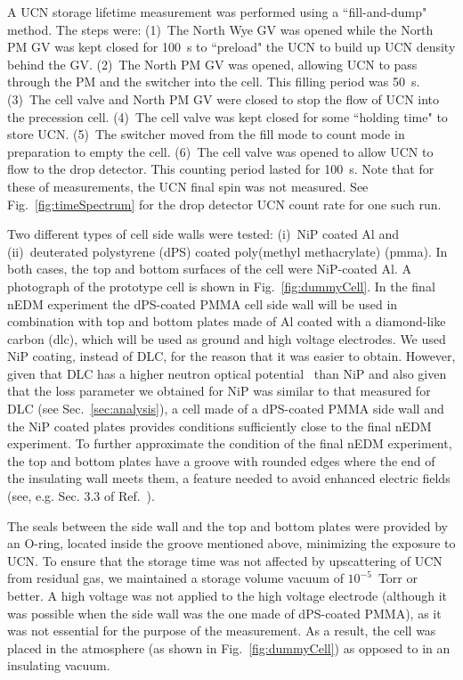 
A UCN storage lifetime measurement was performed using a ``fill-and-dump" method. The steps were: (1)~The North Wye GV was opened while the North PM GV was kept closed for \qty{100}{\s} to ``preload" the UCN to build up UCN density behind the GV. (2)~The North PM GV was opened, allowing UCN to pass through the PM and the switcher into the cell. This filling period was \qty{50}{\s}. (3)~The cell valve and North PM GV were closed to stop the flow of UCN into the precession cell. (4)~The cell valve was kept closed for some ``holding time" to store UCN. (5)~The switcher moved from the fill mode to count mode in preparation to empty the cell. (6)~The cell valve was opened to allow UCN to flow to the drop detector. This counting period lasted for \qty{100}{\s}. Note that for these of measurements, the UCN final spin was not measured. See Fig.~\ref{fig:timeSpectrum} for the drop detector UCN count rate for one such run.

Two different types of cell side walls were tested: (i)~NiP coated Al and (ii)~deuterated polystyrene (dPS) coated poly(methyl methacrylate) (\acrshort*{pmma}). In both cases, the top and bottom surfaces of the cell were NiP-coated Al.  A photograph of the prototype cell is shown in Fig.~\ref{fig:dummyCell}. In the final nEDM experiment the dPS-coated PMMA cell side wall will be used in combination with top and bottom plates made of Al coated with a diamond-like carbon (\acrshort*{dlc}), which will be used as ground and high voltage electrodes. We used NiP coating, instead of DLC, for the reason that it was easier to obtain. However, given that DLC has a higher neutron optical potential~\cite{Atchison2006} than NiP and also given that the loss parameter we obtained for NiP was similar to that measured for DLC (see Sec.~\ref{sec:analysis}), a cell made of a dPS-coated PMMA side wall and the NiP coated plates provides conditions sufficiently close to the final nEDM experiment. To further approximate the condition of the final nEDM experiment, the top and bottom plates have a groove with rounded edges where the end of the insulating wall meets them, a feature needed to avoid enhanced electric fields (see, e.g. Sec. 3.3 of Ref.~\cite{cp_violation_wo_strangeness}).  

The seals between the side wall and the top and bottom plates were provided by an O-ring, located inside the groove mentioned above, minimizing the exposure to UCN. To ensure that the storage time was not affected by upscattering of UCN from residual gas, we maintained a storage volume vacuum of $10^{-5}$~Torr or better. A high voltage was not applied to the high voltage electrode (although it was possible when the side wall was the one made of dPS-coated PMMA), as it was not essential for the purpose of the measurement. As a result, the cell was placed in the atmosphere (as shown in Fig.~\ref{fig:dummyCell}) as opposed to in an insulating vacuum. 

